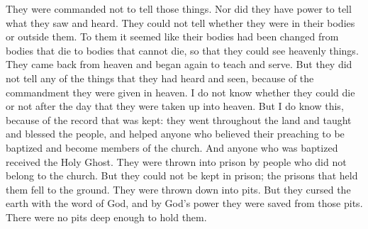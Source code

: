 They were commanded not to tell those things. Nor did they have power to tell what they saw and heard.
\bverse \iffalse And whether they were in the body or out of the body, they could not tell; for it did seem unto them like a transfiguration of them, that they were changed from this body of flesh into an immortal state, that they could behold the things of God. \fi
They could not tell whether they were in their bodies or outside them. To them it seemed like their bodies had been changed from bodies that die to bodies that cannot die, so that they could see heavenly things.
\bverse \iffalse But it came to pass that they did again minister upon the face of the earth; nevertheless they did not minister of the things which they had heard and seen, because of the commandment which was given them in heaven. \fi
They came back from heaven and began again to teach and serve. But they did not tell any of the things that they had heard and seen, because of the commandment they were given in heaven.
\bverse \iffalse And now, whether they were mortal or immortal, from the day of their transfiguration, I know not; \fi
I do not know whether they could die or not after the day that they were taken up into heaven.
\bverse \iffalse But this much I know, according to the record which hath been given--they did go forth upon the face of the land, and did minister unto all the people, uniting as many to the church as would believe in their preaching; baptizing them, and as many as were baptized did receive the Holy Ghost. \fi
But I do know this, because of the record that was kept: they went throughout the land and taught and blessed the people, and helped anyone who believed their preaching to be baptized and become members of the church. And anyone who was baptized received the Holy Ghost.
\bverse \iffalse And they were cast into prison by them who did not belong to the church. And the prisons could not hold them, for they were rent in twain. \fi
They were thrown into prison by people who did not belong to the church. But they could not be kept in prison; the prisons that held them fell to the ground.
\bverse \iffalse And they were cast down into the earth; but they did smite the earth with the word of God, insomuch that by his power they were delivered out of the depths of the earth; and therefore they could not dig pits sufficient to hold them. \fi
They were thrown down into pits. But they cursed the earth with the word of God, and by God's power they were saved from those pits. There were no pits deep enough to hold them.
